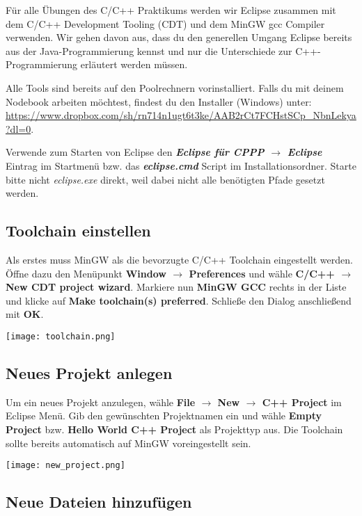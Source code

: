 Für alle Übungen des C/C++ Praktikums werden wir Eclipse zusammen mit dem C/C++ Development Tooling (CDT) und dem MinGW gcc Compiler verwenden.
Wir gehen davon aus, dass du den generellen Umgang Eclipse bereits aus der Java-Programmierung kennst und nur die Unterschiede zur C++-Programmierung erläutert werden müssen.

Alle Tools sind bereits auf den Poolrechnern vorinstalliert.
Falls du mit deinem Nodebook arbeiten möchtest, findest du den Installer (Windows) unter: \url{https://www.dropbox.com/sh/rn714n1ugt6t3ke/AAB2rCt7FCHstSCp_NbnLekya?dl=0}.

Verwende zum Starten von Eclipse den \textbf{\emph{Eclipse für CPPP $\rightarrow$ Eclipse}} Eintrag im Startmenü bzw. das \textbf{\emph{eclipse.cmd}} Script im Installationsordner.
Starte bitte nicht \emph{eclipse.exe} direkt, weil dabei nicht alle benötigten Pfade gesetzt werden.

\subsection{Toolchain einstellen}

Als erstes muss MinGW als die bevorzugte C/C++ Toolchain eingestellt werden.
Öffne dazu den Menüpunkt \textbf{Window $\rightarrow$   Preferences} und wähle \textbf{C/C++ $\rightarrow$  New CDT project wizard}.
Markiere nun \textbf{MinGW GCC} rechts in der Liste und klicke auf \textbf{Make toolchain(s) preferred}.
Schließe den Dialog anschließend mit \textbf{OK}.

\texttt{[image: toolchain.png]}

\subsection{Neues Projekt anlegen}
Um ein neues Projekt anzulegen, wähle \textbf{File $\rightarrow$ New $\rightarrow$ C++ Project} im Eclipse Menü.
Gib den gewünschten Projektnamen ein und wähle \textbf{Empty Project} bzw. \textbf{Hello World C++ Project} als Projekttyp aus.
Die Toolchain sollte bereits automatisch auf MinGW voreingestellt sein.

\begin{center}
	\texttt{[image: new\_project.png]}
\end{center}

\subsection{Neue Dateien hinzufügen}

